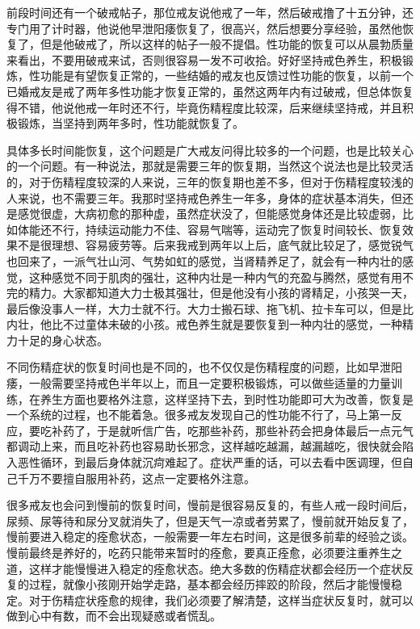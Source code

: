 前段时间还有一个破戒帖子，那位戒友说他戒了一年，然后破戒撸了十五分钟，还专门用了计时器，他说他早泄阳痿恢复了，很高兴，然后想要分享经验，虽然他恢复了，但是他破戒了，所以这样的帖子一般不提倡。性功能的恢复可以从晨勃质量来看出，不要用破戒来试，否则很容易一发不可收拾。好好坚持戒色养生，积极锻炼，性功能是有望恢复正常的，一些结婚的戒友也反馈过性功能的恢复，以前一个已婚戒友是戒了两年多性功能才恢复正常的，虽然这两年内有过破戒，但总体恢复得不错，他说他戒一年时还不行，毕竟伤精程度比较深，后来继续坚持戒，并且积极锻炼，当坚持到两年多时，性功能就恢复了。

具体多长时间能恢复，这个问题是广大戒友问得比较多的一个问题，也是比较关心的一个问题。有一种说法，那就是需要三年的恢复期，当然这个说法也是比较灵活的，对于伤精程度较深的人来说，三年的恢复期也差不多，但对于伤精程度较浅的人来说，也不需要三年。我那时坚持戒色养生一年多，身体的症状基本消失，但还是感觉很虚，大病初愈的那种虚，虽然症状没了，但能感觉身体还是比较虚弱，比如体能还不行，持续运动能力不佳、容易气喘等，运动完了恢复时间较长、恢复效果不是很理想、容易疲劳等。后来我戒到两年以上后，底气就比较足了，感觉锐气也回来了，一派气壮山河、气势如虹的感觉，当肾精养足了，就会有一种内壮的感觉，这种感觉不同于肌肉的强壮，这种内壮是一种内气的充盈与腾然，感觉有用不完的精力。大家都知道大力士极其强壮，但是他没有小孩的肾精足，小孩哭一天，最后像没事人一样，大力士就不行。大力士搬石球、拖飞机、拉卡车可以，但是比内壮，他比不过童体未破的小孩。戒色养生就是要恢复到一种内壮的感觉，一种精力十足的身心状态。

不同伤精症状的恢复时间也是不同的，也不仅仅是伤精程度的问题，比如早泄阳痿，一般需要坚持戒色半年以上，而且一定要积极锻炼，可以做些适量的力量训练，在养生方面也要格外注意，这样坚持下去，到时性功能即可大为改善，恢复是一个系统的过程，也不能着急。很多戒友发现自己的性功能不行了，马上第一反应，要吃补药了，于是就听信广告，吃那些补药，那些补药会把身体最后一点元气都调动上来，而且吃补药也容易助长邪念，这样越吃越漏，越漏越吃，很快就会陷入恶性循环，到最后身体就沉疴难起了。症状严重的话，可以去看中医调理，但自己千万不要擅自服用补药，这点一定要格外注意。

很多戒友也会问到慢前的恢复时间，慢前是很容易反复的，有些人戒一段时间后，尿频、尿等待和尿分叉就消失了，但是天气一凉或者劳累了，慢前就开始反复了，慢前要进入稳定的痊愈状态，一般需要一年左右时间，这是很多前辈的经验之谈。慢前最终是养好的，吃药只能带来暂时的痊愈，要真正痊愈，必须要注重养生之道，这样才能慢慢进入稳定的痊愈状态。绝大多数的伤精症状都会经历一个症状反复的过程，就像小孩刚开始学走路，基本都会经历摔跤的阶段，然后才能慢慢稳定。对于伤精症状痊愈的规律，我们必须要了解清楚，这样当症状反复时，就可以做到心中有数，而不会出现疑惑或者慌乱。

